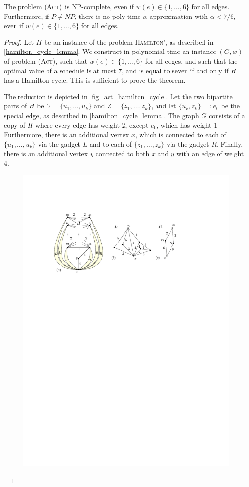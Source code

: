 \documentclass[runningheads]{llncs}
\numberwithin{equation}{section}
\newcommand{\set}[1]{\{ #1 \}}
\newcommand{\fromto}[2]{\set{#1, \ldots, #2}}
\newcommand{\act}{\textsc{(Act)}}
\begin{document}
\begin{theorem}
\label{corollary_act_no_approx}
The problem \act\ is NP-complete, even if $w(e) \in \fromto{1}{6}$ for all edges. Furthermore, if $P \neq NP$, there is no poly-time $\alpha$-approximation with $\alpha < 7/6$, even if $w(e) \in \fromto{1}{6}$ for all edges.
\end{theorem}
\begin{proof}
Let $H$ be an instance of the problem \textsc{Hamilton'}, as described in \cref{hamilton_cycle_lemma}. We construct in polynomial time an instance $(G, w)$ of problem \act, such that $w(e) \in \fromto{1}{6}$ for all edges, and such that the optimal value of a schedule is at most 7, and is equal to seven if and only if $H$ has a Hamilton cycle. This is sufficient to prove the theorem.

The reduction is depicted in \cref{fig_act_hamilton_cycle}. Let the two bipartite parts of $H$ be $U = \fromto{u_1}{u_k}$ and $Z = \fromto{z_1}{z_k}$, and let $\set{u_k, z_k} =: e_0$ be the special edge, as described in \cref{hamilton_cycle_lemma}. The graph $G$ consists of a copy of $H$ where every edge has weight 2, except $e_0$, which has weight 1. Furthermore, there is an additional vertex $x$, which is connected to each of $\fromto{u_1}{u_k}$ via the gadget $L$ and to each of $\fromto{z_1}{z_k}$ via the gadget $R$. Finally, there is an additional vertex $y$ connected to both $x$ and $y$ with an edge of weight 4.
\begin{figure}[htpb]
\centering
\includegraphics[scale=1]{img/act-hamilton-cycle}

\end{figure}
\end{proof}
\end{document}
